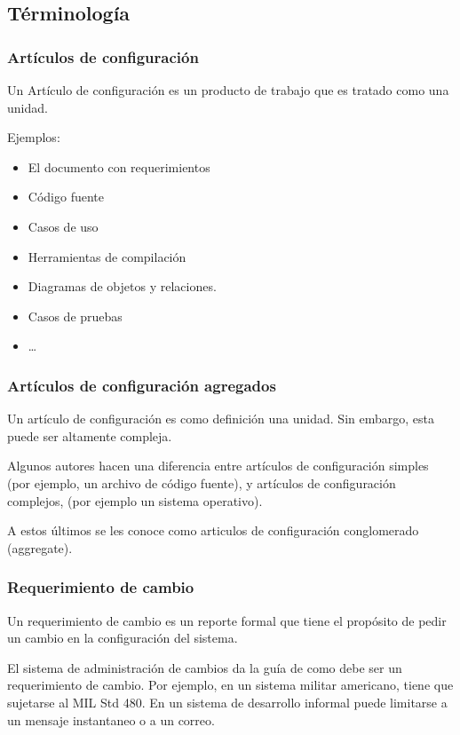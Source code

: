 \subsection{T\'erminolog\'ia}
\begin{frame}
\frametitle{Art\'iculos de configuraci\'on}

\begin{definicion}
Un \alert{Art\'iculo de configuraci\'on} es un producto de trabajo que es
tratado como una unidad. 
\end{definicion}

Ejemplos: 
\begin{itemize}
  \item El documento con requerimientos
  \item C\'odigo fuente
  \item Casos de uso
  \item Herramientas de compilaci\'on
  \item Diagramas de objetos y relaciones.
  \item Casos de pruebas 
  \item \ldots
\end{itemize}
\end{frame}

\begin{frame}
\frametitle{Art\'iculos de configuraci\'on agregados}
Un art\'iculo de configuraci\'on es como definici\'on una unidad. Sin embargo,
esta puede ser altamente compleja. 

Algunos autores hacen una diferencia entre art\'iculos de configuraci\'on
simples (por ejemplo, un archivo de c\'odigo fuente), y art\'iculos de
configuraci\'on complejos, (por ejemplo un sistema operativo).

A estos \'ultimos se les conoce como articulos de configuraci\'on conglomerado
(aggregate).
\end{frame}
\begin{frame}
\frametitle{Requerimiento de cambio}

\begin{definicion}
Un \alert{requerimiento de cambio} es un reporte formal que tiene el prop\'osito
de pedir un cambio en la configuraci\'on del sistema. 
\end{definicion}
El sistema de administraci\'on de cambios da la gu\'ia de como debe ser un
requerimiento de cambio. Por ejemplo, en un sistema militar americano, tiene que
sujetarse al MIL Std 480. En un sistema de desarrollo informal puede limitarse a
un mensaje instantaneo o a un correo. 
\end{frame}

